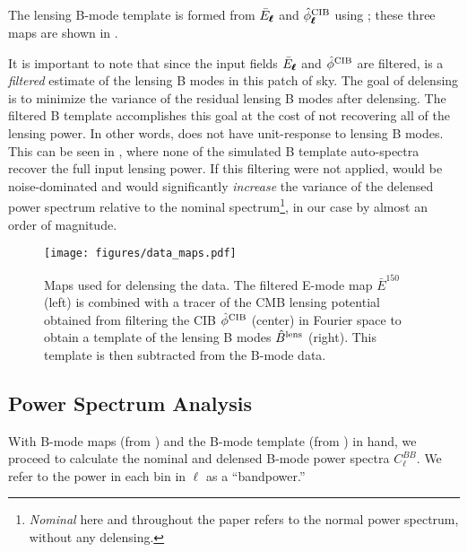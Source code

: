 The lensing B-mode template \bhat{} is formed from $\bar{E}_{\pmb{\ell}}$ and $\hat{\phi}^{\rm CIB}_{\pmb{\ell}}$ using ;
these three maps are shown in .

It is important to note that since the input fields $\bar{E}_{\pmb{\ell}}$ and $\hat{\phi}^{\rm CIB}$ are filtered, \bhat{} is a \textit{filtered} estimate of the lensing B modes in this patch of sky.
The goal of delensing is to minimize the variance of the residual lensing B modes after delensing.
The filtered B template accomplishes this goal at the cost of not recovering all of the lensing power.
In other words, \bhat{} does not have unit-response to lensing B modes.
This can be seen in , where none of the simulated B template auto-spectra recover the full input lensing power.
If this filtering were not applied, \bhat{} would be noise-dominated and would significantly \textit{increase} the variance of the delensed power spectrum relative to the nominal spectrum\footnote{\textit{Nominal} here and throughout the paper refers to the normal power spectrum, without any delensing.}, in our case by almost an order of magnitude.

\begin{figure*}
\begin{center}
\texttt{[image: figures/data\_maps.pdf]}
\caption{Maps used for delensing the data.
The filtered E-mode map $\bar{E}^{150}$ (left) is combined with a tracer of the CMB lensing potential obtained from filtering the CIB $\hat \phi^{\rm{CIB}}$ (center) in Fourier space to obtain a template of the lensing B modes $\hat B^{\rm{lens}}$ (right). This template is then subtracted from the B-mode data.}
\label{fig:data-maps}
\end{center}
\end{figure*}

\subsection{Power Spectrum Analysis}
\label{sec:clbb}
With B-mode maps (from ) and the B-mode template \bhat{} (from ) in hand,
we proceed to calculate the nominal and delensed B-mode power spectra $C_{\ell}^{BB}$.
We refer to the power in each bin in $\ell$ as a ``bandpower.''

